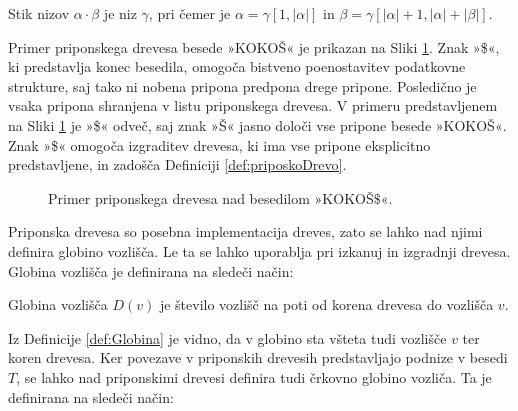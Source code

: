 \begin{defi}
    Stik nizov $\alpha\cdot\beta$ je niz $\gamma$, pri čemer je $\alpha=\gamma[1,|\alpha|]$ in $\beta=\gamma[|\alpha|+1,|\alpha|+|\beta|]$.
\end{defi}



Primer priponskega drevesa besede »KOKOŠ« je prikazan na Sliki \ref{fig:PriponskoDrevo}. Znak »\$«, ki predstavlja konec besedila, omogoča bistveno poenostavitev podatkovne strukture, saj tako ni nobena pripona predpona drege pripone. Posledično je vsaka pripona shranjena v listu priponskega drevesa. V primeru predstavljenem na Sliki \ref{fig:PriponskoDrevo} je »\$« odveč, saj znak »Š« jasno določi vse pripone besede »KOKOŠ«. Znak »\$« omogoča izgraditev drevesa, ki ima vse pripone eksplicitno predstavljene, in zadošča Definiciji \ref{def:priposkoDrevo}.

\begin{figure}[htb]
    \begin{center}
        
        \caption{Primer priponskega drevesa nad besedilom »KOKOŠ$\$$«.} 
        \label{fig:PriponskoDrevo}
    \end{center}
\end{figure}


Priponska drevesa so posebna implementacija dreves, zato se lahko nad njimi definira globino vozlišča. Le ta se lahko uporablja pri izkanuj in izgradnji drevesa. Globina vozlišča je definirana na sledeči način:

\begin{defi}\label{def:Globina}
   Globina vozlišča $D(v)$ je število vozlišč na poti od korena drevesa do vozlišča $v$. 
\end{defi}

Iz Definicije \ref{def:Globina} je vidno, da v globino sta všteta tudi vozlišče $v$ ter koren drevesa. 
Ker povezave v priponskih drevesih predstavljajo podnize v besedi $T$, se lahko nad priponskimi drevesi definira tudi črkovno globino vozliča. Ta je definirana na sledeči način:



